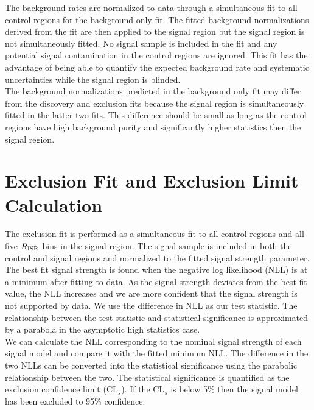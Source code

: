 \indent The background rates are normalized to data through a simultaneous fit to all control regions for the background only fit.  The fitted background normalizations derived from the fit are then applied to the signal region but the signal region is not simultaneously fitted.  No signal sample is included in the fit and any potential signal contamination in the control regions are ignored.  This fit has the advantage of being able to quantify the expected background rate and systematic uncertainties while the signal region is blinded. \\


\indent The background normalizations predicted in the background only fit may differ from the discovery and exclusion fits because the signal region is simultaneously fitted in the latter two fits. This difference should be small as long as the control regions have high background purity and significantly higher statistics then the signal region.  \\

\section{Exclusion Fit and Exclusion Limit Calculation}
\label{sec:stat:limit}

\indent The exclusion fit is performed as a simultaneous fit to all control regions and all five $R_{\mathrm{ISR}}$ bins in the signal region. The signal sample is included in both the control and signal regions and normalized to the fitted signal strength parameter.   \\

\indent The best fit signal strength is found when the negative log likelihood (NLL) is at a minimum after fitting to data.  As the signal strength deviates from the best fit value, the NLL increases and we are more confident that the signal strength is not supported by data.  We use the difference in NLL as our test statistic.  The relationship between the test statistic and statistical significance is approximated by a parabola in the asymptotic high statistics case. \\

\indent We can calculate the NLL corresponding to the nominal signal strength of each signal model and compare it with the fitted minimum NLL.  The difference in the two NLLs can be converted into the statistical significance using the parabolic relationship between the two.  The statistical significance is quantified as the exclusion confidence limit (CL$_s$).  If the CL$_s$ is below 5\% then the signal model has been excluded to 95\% confidence. \\

